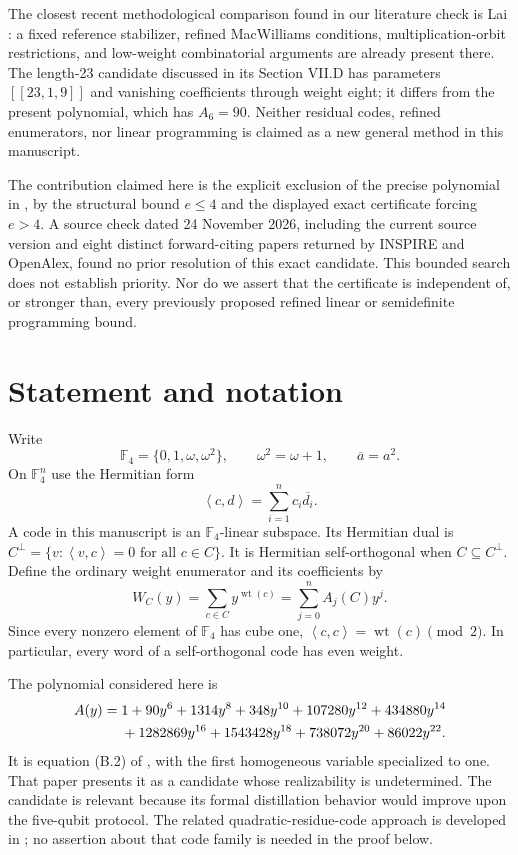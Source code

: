\documentclass[11pt]{article}
\theoremstyle{remark}
\newcommand{\F}{\mathbb F_4}
\newcommand{\wt}{\operatorname{wt}}
\newcommand{\ip}[2]{\left\langle #1,#2\right\rangle}
\begin{document}
The closest recent methodological comparison found in our literature
check is Lai \cite[Sections VI--VII]{Lai}: a fixed reference stabilizer,
refined MacWilliams conditions, multiplication-orbit restrictions, and
low-weight combinatorial arguments are already present there.
The length-23 candidate discussed in its Section VII.D has parameters
$[[23,1,9]]$ and vanishing coefficients through weight eight;
it differs from the present polynomial, which has $A_6=90$.
Neither residual codes, refined enumerators, nor linear programming
is claimed as a new general method in this manuscript.

The contribution claimed here is the explicit exclusion of the precise
polynomial in \cite[equation (B.2)]{KP}, by the structural bound $e\leq4$
and the displayed exact certificate forcing $e>4$.
A source check dated 24 November 2026, including the current source
version and eight distinct forward-citing papers returned by INSPIRE
and OpenAlex, found no prior resolution of this exact candidate.
This bounded search does not establish priority.  Nor do we assert
that the certificate is independent of, or stronger than, every
previously proposed refined linear or semidefinite programming bound.

\section{Statement and notation}

Write
\[
 \F=\{0,1,\omega,\omega^2\},\qquad
 \omega^2=\omega+1,\qquad \overline a=a^2.
\]
On $\F^n$ use the Hermitian form
\[
 \ip{c}{d}=\sum_{i=1}^n c_i\overline{d_i}.
\]
A code in this manuscript is an $\F$-linear subspace.  Its Hermitian dual is
$C^\perp=\{v:\ip{v}{c}=0\text{ for all }c\in C\}$.  It is
Hermitian self-orthogonal when $C\subseteq C^\perp$.  Define the ordinary
weight enumerator and its coefficients by
\[
 W_C(y)=\sum_{c\in C}y^{\wt(c)}=\sum_{j=0}^n A_j(C)y^j.
\]
Since every nonzero element of $\F$ has cube one,
$\ip{c}{c}=\wt(c)\pmod2$.  In particular, every word of a self-orthogonal
code has even weight.

The polynomial considered here is
\begin{align}
 A(y)={}&1+90y^6+1314y^8+348y^{10}+107280y^{12}
       +434880y^{14}\notag\\
       &+1282869y^{16}+1543428y^{18}
       +738072y^{20}+86022y^{22}.
 \label{eq:target}
\end{align}
It is equation (B.2) of \cite[Appendix B]{KP}, with the first homogeneous
variable specialized to one.  That paper presents it as a candidate whose
realizability is undetermined.  The candidate is relevant because its
formal distillation behavior would improve upon the five-qubit protocol.
The related quadratic-residue-code approach is developed in \cite{ZJS};
no assertion about that code family is needed in the proof below.
\end{document}
